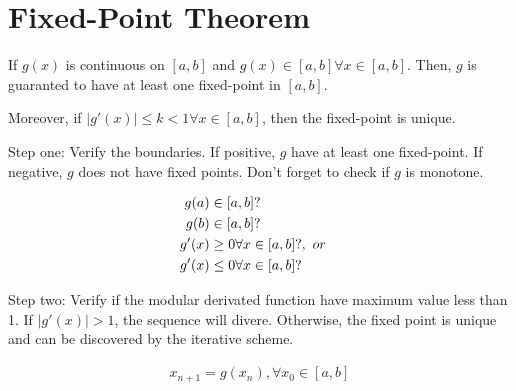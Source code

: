 \section{Fixed-Point Theorem}

	If $g(x)$ is continuous on $[a,b]$ and $g(x) \in [a,b] \forall x \in [a,b]$. Then, $g$ is guaranted to have at least one fixed-point in $[a,b]$.
	
	Moreover, if $|g'(x)| \leq k < 1 \forall x \in [a,b]$, then the fixed-point is unique.

	Step one: Verify the boundaries. If positive, $g$ have at least one fixed-point. If negative, $g$ does not have fixed points. Don't forget to check if $g$ is monotone.
	
	\begin{align}
		g(a) &\in [a,b]?& \\
		g(b) &\in [a,b]?& \\
		g'(x) &\geq 0 \forall x \in [a,b]?, \ or& \notag \\
		g'(x) &\leq 0 \forall x \in [a,b]?&
		\label{eq:fpone}
	\end{align}

	Step two: Verify if the modular derivated function have maximum value less than 1. If $|g'(x)| > 1$, the sequence will divere. Otherwise, the fixed point is unique and can be discovered by the iterative scheme.

	\begin{align}
		x_{n+1} = g(x_{n}), \forall x_{0} \in [a,b]
		\label{eq:fptwo}
	\end{align}